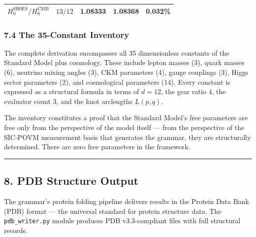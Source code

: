 \begin{longtable}[]{@{}lllll@{}}
\begin{minipage}[t]{0.13\columnwidth}
\(H_0^{\text{SH0ES}}/H_0^{\text{CMB}}\)\strut
\end{minipage} & \begin{minipage}[t]{0.25\columnwidth}\raggedright
\(13/12\)\strut
\end{minipage} & \begin{minipage}[t]{0.20\columnwidth}\raggedright
1.08333\strut
\end{minipage} & \begin{minipage}[t]{0.21\columnwidth}\raggedright
1.08368\strut
\end{minipage} & \begin{minipage}[t]{0.07\columnwidth}\raggedright
0.032\%\strut
\end{minipage}\tabularnewline
\bottomrule
\end{longtable}

\hypertarget{the-35-constant-inventory}{%
\subsubsection{7.4 The 35-Constant
Inventory}\label{the-35-constant-inventory}}

The complete derivation encompasses all 35 dimensionless constants of
the Standard Model plus cosmology. These include lepton masses (3),
quark masses (6), neutrino mixing angles (3), CKM parameters (4), gauge
couplings (3), Higgs sector parameters (2), and cosmological parameters
(14). Every constant is expressed as a structural formula in terms of
\(d=12\), the gear ratio \(4\), the evaluator count \(3\), and the knot
arclengths \(L(p,q)\).

The inventory constitutes a proof that the Standard Model's free
parameters are free only from the perspective of the model itself ---
from the perspective of the SIC-POVM measurement basis that generates
the grammar, they are structurally determined. There are zero free
parameters in the framework.

\begin{center}\rule{0.5\linewidth}{0.5pt}\end{center}

\hypertarget{pdb-structure-output}{%
\subsection{8. PDB Structure Output}\label{pdb-structure-output}}

The grammar's protein folding pipeline delivers results in the Protein
Data Bank (PDB) format --- the universal standard for protein structure
data. The \texttt{pdb\_writer.py} module produces PDB v3.3-compliant
files with full structural records.

